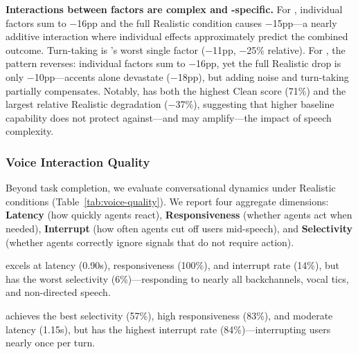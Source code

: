 \textbf{Interactions between factors are complex and -specific.} For , individual factors sum to $-$16pp and the full Realistic condition causes $-$15pp---a nearly additive interaction where individual effects approximately predict the combined outcome. Turn-taking is 's worst single factor ($-$11pp, $-$25\% relative). For , the pattern reverses: individual factors sum to $-$16pp, yet the full Realistic drop is only $-$10pp---accents alone devastate  ($-$18pp), but adding noise and turn-taking partially compensates. Notably,  has both the highest Clean score (71\%) and the largest relative Realistic degradation ($-$37\%), suggesting that higher baseline capability does not protect against---and may amplify---the impact of speech complexity.

\subsubsection{Voice Interaction Quality}

Beyond task completion, we evaluate conversational dynamics under Realistic conditions (Table~\ref{tab:voice-quality}). We report four aggregate dimensions: \textbf{Latency} (how quickly agents react), \textbf{Responsiveness} (whether agents act when needed), \textbf{Interrupt} (how often agents cut off users mid-speech), and \textbf{Selectivity} (whether agents correctly ignore signals that do not require action).

\begin{table}[h]
\caption{Voice interaction quality (Realistic condition, aggregated across domains). \textbf{Bold} indicates best. Full breakdown in Appendix~\ref{app:voice-metrics-detail}.}
\label{tab:voice-quality}
\centering
\begin{small}
\resizebox{\columnwidth}{!}{%

}
\end{small}
\end{table}



\textbf{} excels at latency (0.90s), responsiveness (100\%), and interrupt rate (14\%), but has the worst selectivity (6\%)---responding to nearly all backchannels, vocal tics, and non-directed speech.

\textbf{} achieves the best selectivity (57\%), high responsiveness (83\%), and moderate latency (1.15s), but has the highest interrupt rate (84\%)---interrupting users nearly once per turn.

